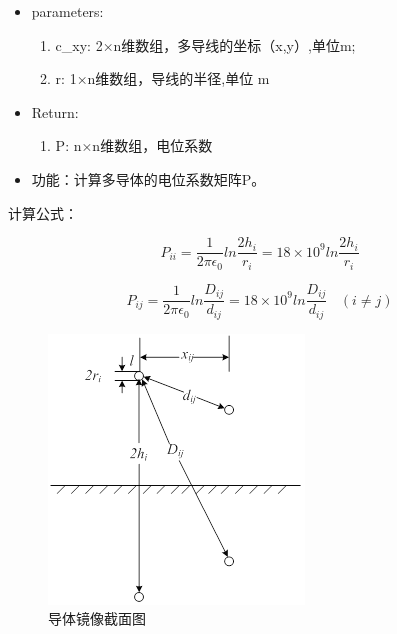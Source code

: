\documentclass[11pt]{article}
\makeatletter
\def\maxwidth{\ifdim\Gin@nat@width>\linewidth\linewidth
    \else\Gin@nat@width\fi}
\let\Oldincludegraphics\includegraphics
\renewcommand{\includegraphics}[1]{\Oldincludegraphics[width=.8\maxwidth]{#1}}
\providecommand{\tightlist}{%
      \setlength{\itemsep}{0pt}\setlength{\parskip}{0pt}}
\makeatother
\begin{document}
\begin{itemize}
\tightlist
\item
  parameters:

  \begin{enumerate}
  \def\labelenumi{\arabic{enumi}.}
  \tightlist
  \item
    c\_xy: 2×n维数组，多导线的坐标（x,y）,单位m;\\
  \item
    r: 1×n维数组，导线的半径,单位 m\\
  \end{enumerate}
\item
  Return:

  \begin{enumerate}
  \def\labelenumi{\arabic{enumi}.}
  \tightlist
  \item
    P: n×n维数组，电位系数\\
  \end{enumerate}
\item
  功能：计算多导体的电位系数矩阵P。
\end{itemize}

计算公式：

\[ P_{ii}=\frac{1}{2\pi\epsilon_0}ln\frac{2h_{i}}{r_i} = 18×10^9 ln\frac{2h_{i}}{r_i} \]

\[ P_{ij}=\frac{1}{2\pi\epsilon_0}ln\frac{D_{ij}}{d_{ij}} = 18×10^9 ln\frac{D_{ij}}{d_{ij}}  ~~~~ (i≠j) \]

\begin{figure}
\centering
\includegraphics{导体镜像截面图.png}
\caption{导体镜像截面图}
\end{figure}
\end{document}
